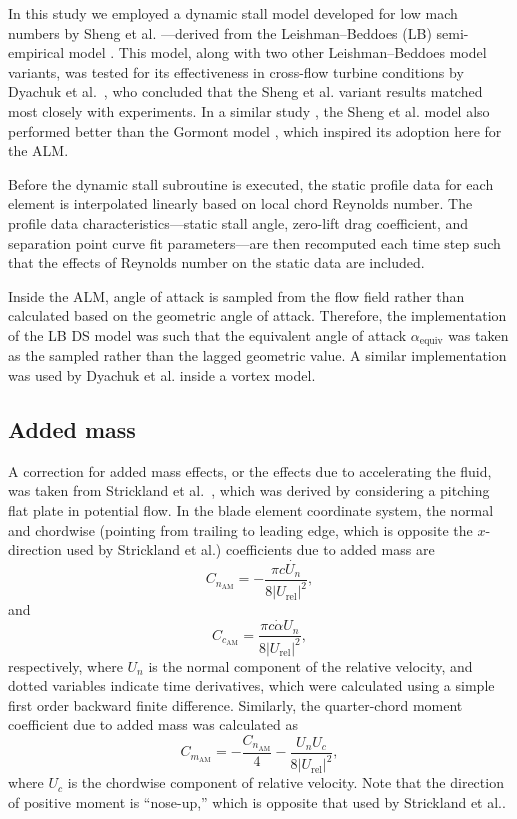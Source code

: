 \documentclass[times]{weauth}
\begin{document}
In this study we employed a dynamic stall model developed for low mach numbers
by Sheng et al. \cite{Sheng2008}---derived from the Leishman--Beddoes (LB)
semi-empirical model \cite{Leishman1989}. This model, along with two other
Leishman--Beddoes model variants, was tested for its effectiveness in cross-flow
turbine conditions by Dyachuk et al.~\cite{Dyachuk2014}, who concluded that the
Sheng et al. variant results matched most closely with experiments. In a similar
study \cite{Dyachuk2015}, the Sheng et al. model also performed better than the
Gormont model \cite{Gormont1973}, which inspired its adoption here for the ALM.

Before the dynamic stall subroutine is executed, the static profile data for
each element is interpolated linearly based on local chord Reynolds number. The
profile data characteristics---static stall angle, zero-lift drag coefficient,
and separation point curve fit parameters---are then recomputed each time step
such that the effects of Reynolds number on the static data are included.

Inside the ALM, angle of attack is sampled from the flow field rather than
calculated based on the geometric angle of attack. Therefore, the implementation
of the LB DS model was such that the equivalent angle of attack
$\alpha_\mathrm{equiv}$ was taken as the sampled rather than the lagged
geometric value. A similar implementation was used by Dyachuk et al.
\cite{Dyachuk2015a} inside a vortex model.


\subsection{Added mass}

A correction for added mass effects, or the effects due to accelerating the
fluid, was taken from Strickland et al.~\cite{Strickland1981}, which was derived
by considering a pitching flat plate in potential flow. In the blade element
coordinate system, the normal and chordwise (pointing from trailing to leading
edge, which is opposite the $x$-direction used by Strickland et al.)
coefficients due to added mass are
\begin{equation}
    C_{n_\mathrm{AM}} = -\frac{\pi c \dot{U_n}}{8 | U_\mathrm{rel} |^2},
\end{equation}
and
\begin{equation}
    C_{c_\mathrm{AM}} = \frac{\pi c \dot{\alpha} U_n }{8 | U_\mathrm{rel} |^2},
\end{equation}
respectively, where $U_n$ is the normal component of the relative velocity, and
dotted variables indicate time derivatives, which were calculated using a simple
first order backward finite difference. Similarly, the quarter-chord moment
coefficient due to added mass was calculated as
\begin{equation}
    C_{m_\mathrm{AM}} = -\frac{C_{n_\mathrm{AM}}}{4}
        - \frac{U_n U_c}{8 | U_\mathrm{rel} |^2},
\end{equation}
where $U_c$ is the chordwise component of relative velocity. Note that the
direction of positive moment is ``nose-up,'' which is opposite that used by
Strickland et al..
\end{document}
